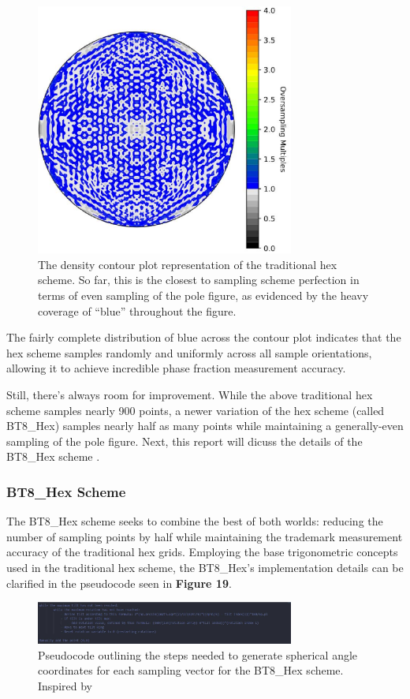 \documentclass[10pt]{article}
\begin{document}
\begin{figure}[h]
    \centering
    \includegraphics[width=8.5cm]{fig18}
    \caption{\label{tab1}The density contour plot representation of the traditional hex scheme. So far, this is the closest to sampling scheme perfection in terms of even sampling of the pole figure, 
    as evidenced by the heavy coverage of “blue” throughout the figure.} 
    \end{figure}

The fairly complete distribution of blue across the contour plot indicates that the hex scheme samples randomly
and uniformly across all sample orientations, allowing it to achieve incredible phase fraction measurement accuracy.

Still, there’s always room for improvement. While the above traditional hex scheme samples nearly 900 points, 
a newer variation of the hex scheme (called BT8\_Hex) samples nearly half as many points while maintaining a generally-even 
sampling of the pole figure. Next, this report will dicuss the details of the BT8\_Hex scheme \cite{ref12}.


\subsubsection{BT8\_Hex Scheme}
The BT8\_Hex scheme seeks to combine the best of both worlds: reducing the number of sampling points by half while maintaining the 
trademark measurement accuracy of the traditional hex grids. Employing the base trigonometric concepts used in the traditional hex scheme, the BT8\_Hex's implementation
details can be clarified in the pseudocode seen in \textbf{Figure 19}.
\begin{figure}[h]
    \centering
    \includegraphics[width=8.5cm]{fig19}
    \caption{\label{tab1}Pseudocode outlining the steps needed to generate spherical angle coordinates for each sampling vector 
    for the BT8\_Hex scheme. Inspired by \cite{ref12}} 
    \end{figure} 
\end{document}
